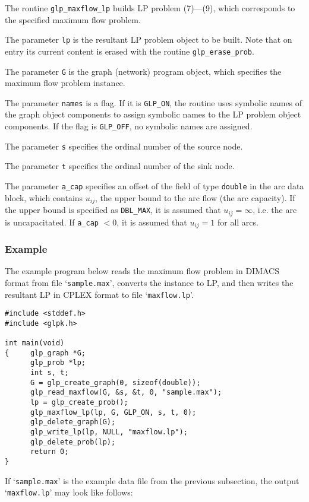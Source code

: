The routine \verb|glp_maxflow_lp| builds LP problem (7)---(9), which
corresponds to the specified maximum flow problem.

The parameter \verb|lp| is the resultant LP problem object to be built.
Note that on entry its current content is erased with the routine
\verb|glp_erase_prob|.

The parameter \verb|G| is the graph (network) program object, which
specifies the maximum flow problem instance.

The parameter \verb|names| is a flag. If it is \verb|GLP_ON|, the
routine uses symbolic names of the graph object components to assign
symbolic names to the LP problem object components. If the flag is
\verb|GLP_OFF|, no symbolic names are assigned.

The parameter \verb|s| specifies the ordinal number of the source node.

The parameter \verb|t| specifies the ordinal number of the sink node.

The parameter \verb|a_cap| specifies an offset of the field of type
\verb|double| in the arc data block, which contains $u_{ij}$, the upper
bound to the arc flow (the arc capacity). If the upper bound is
specified as \verb|DBL_MAX|, it is assumed that $u_{ij}=\infty$, i.e.
the arc is uncapacitated. If \verb|a_cap| $<0$, it is assumed that
$u_{ij}=1$ for all arcs.

\subsubsection*{Example}

The example program below reads the maximum flow problem in DIMACS
format from file `\verb|sample.max|', converts the instance to LP, and
then writes the resultant LP in CPLEX format to file
`\verb|maxflow.lp|'.

\begin{verbatim}
#include <stddef.h>
#include <glpk.h>

int main(void)
{     glp_graph *G;
      glp_prob *lp;
      int s, t;
      G = glp_create_graph(0, sizeof(double));
      glp_read_maxflow(G, &s, &t, 0, "sample.max");
      lp = glp_create_prob();
      glp_maxflow_lp(lp, G, GLP_ON, s, t, 0);
      glp_delete_graph(G);
      glp_write_lp(lp, NULL, "maxflow.lp");
      glp_delete_prob(lp);
      return 0;
}
\end{verbatim}

\newpage

If `\verb|sample.max|' is the example data file from the previous
subsection, the output `\verb|maxflow.lp|' may look like follows:

